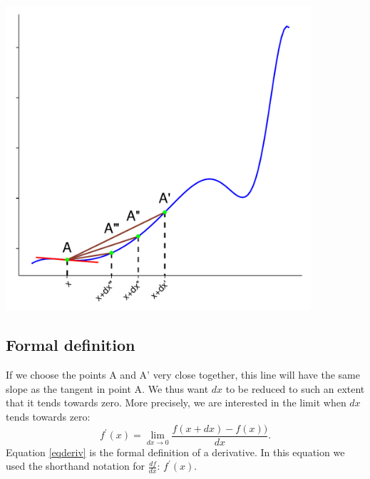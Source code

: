 \documentclass[a4paper]{report}
\begin{document}
\begin{center}
\includegraphics[width=0.85\textwidth]{der_graph4.pdf}
\end{center}
\subsection{Formal definition}
If we choose the points A and A\textquoteright \; very close together, this line will have the same slope as the tangent in point A. We thus want $dx$ to be reduced to such an extent that it tends towards zero. More precisely, we are interested in the limit when $dx$ tends towards zero:
\begin{equation}
f^\prime(x)=\lim\limits_{dx \to 0}\frac{f(x+dx)-f(x))}{dx}.
\label{eqderiv}
\end{equation}
Equation \ref{eqderiv} is the formal definition of a derivative. In this equation we used the shorthand notation for $\frac{df}{dx}$: $f^\prime (x)$.
\end{document}
